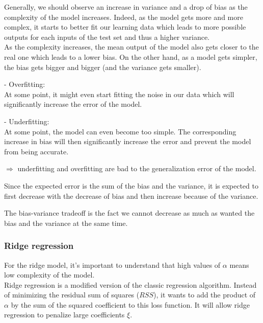 \documentclass[12pt,titlepage]{article}
\begin{document}
Generally, we should observe an increase in variance and a drop of bias as the complexity of the model increases.
Indeed, as the model gets more and more complex, it starts to better fit our learning data which leads to more possible outputs for each inputs of the test set and thus a higher variance. \\
As the complexity increases, the mean output of the model also gets closer to the real one which leads to a lower bias. On the other hand, as a model gets simpler, the bias gets bigger and bigger (and the variance gets smaller). 

\vspace{0.2cm}

- Overfitting: \\
At some point, it might even start fitting the noise in our data which will significantly increase the error of the model.

\vspace{0.2cm}

- Underfitting: \\
At some point, the model can even become too simple. The corresponding increase in bias will then significantly increase the error and prevent the model from being accurate.

$\Rightarrow$ underfitting and overfitting are bad to the generalization error of the model.

\vspace{0.3cm}

Since the expected error is the sum of the bias and the variance, it is expected to first decrease with the decrease of bias and then increase because of the variance.

\vspace{0.3cm}

The bias-variance tradeoff is the fact we cannot decrease as much as wanted the bias and the variance at the same time.

\subsubsection{Ridge regression}
For the ridge model, it’s important to understand that high values of $\alpha$ means low complexity of the model. \\

Ridge regression is a modified version of the classic regression algorithm. Instead of minimizing the residual sum of squares ($RSS$), it wants to add the product of $\alpha$ by the sum of the squared coefficient to this loss function. It will allow ridge regression to
penalize large coefficients $\xi$.
\end{document}
